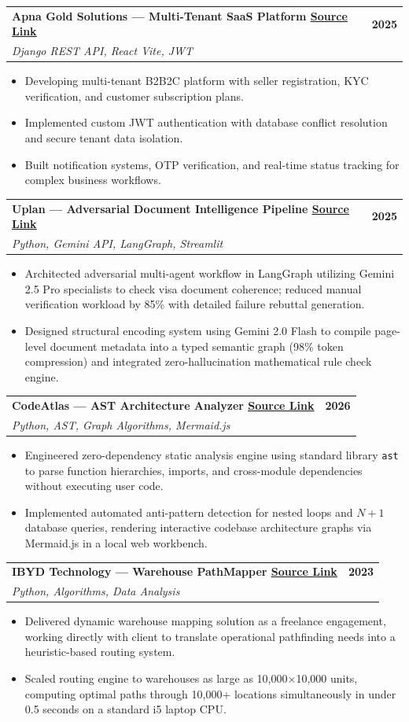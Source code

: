 \documentclass[letterpaper,10.5pt]{article}
\makeatletter
\newcommand{\resumeItem}[1]{
	\item\small{{#1}}
}
\newcommand{\resumeProjectHeading}[3]{
	\item
	\begin{tabular*}{\textwidth}[t]{l@{\extracolsep{\fill}}r}
		\textbf{#1} & \textbf{\small #3} \\
		\textit{\small#2} & \\
	\end{tabular*}\vspace{-4pt}
}
\newcommand{\resumeItemListStart}{\begin{itemize}[leftmargin=0.18in, itemsep=1.5pt, topsep=2pt, parsep=0pt]}
\newcommand{\resumeItemListEnd}{\end{itemize}\vspace{2pt}}
\makeatother
\begin{document}
	\resumeProjectHeading
	{Apna Gold Solutions — Multi-Tenant SaaS Platform {\href{https://apnagold.in}{\color{blue}\underline{Source Link}}}}{Django REST API, React Vite, JWT}{2025}
	\resumeItemListStart
	\resumeItem{Developing multi-tenant B2B2C platform with seller registration, KYC verification, and customer subscription plans.}
	\resumeItem{Implemented custom JWT authentication with database conflict resolution and secure tenant data isolation.}
	\resumeItem{Built notification systems, OTP verification, and real-time status tracking for complex business workflows.}
	\resumeItemListEnd 

	\resumeProjectHeading
	{Uplan — Adversarial Document Intelligence Pipeline {\href{https://huggingface.co/spaces/ksk76/AMDDeveloperHackathon}{\color{blue}\underline{Source Link}}}}{Python, Gemini API, LangGraph, Streamlit}{2025}
	\resumeItemListStart
	\resumeItem{Architected adversarial multi-agent workflow in LangGraph utilizing Gemini 2.5 Pro specialists to check visa document coherence; reduced manual verification workload by 85\% with detailed failure rebuttal generation.}
	\resumeItem{Designed structural encoding system using Gemini 2.0 Flash to compile page-level document metadata into a typed semantic graph (98\% token compression) and integrated zero-hallucination mathematical rule check engine.}
	\resumeItemListEnd

	\resumeProjectHeading
	{CodeAtlas — AST Architecture Analyzer {\href{https://github.com/Adarsh-Saurabh/CodeAtlas}{\color{blue}\underline{Source Link}}}}{Python, AST, Graph Algorithms, Mermaid.js}{2026}
	\resumeItemListStart
	\resumeItem{Engineered zero-dependency static analysis engine using standard library \texttt{ast} to parse function hierarchies, imports, and cross-module dependencies without executing user code.}
	\resumeItem{Implemented automated anti-pattern detection for nested loops and $N+1$ database queries, rendering interactive codebase architecture graphs via Mermaid.js in a local web workbench.}
	\resumeItemListEnd

	\resumeProjectHeading
	{IBYD Technology — Warehouse PathMapper {\href{https://youtu.be/nTAbJAMX3GY}{\color{blue}\underline{Source Link}}}}{Python, Algorithms, Data Analysis}{2023}
	\resumeItemListStart
	\resumeItem{Delivered dynamic warehouse mapping solution as a freelance engagement, working directly with client to translate operational pathfinding needs into a heuristic-based routing system.}
	\resumeItem{Scaled routing engine to warehouses as large as 10,000$\times$10,000 units, computing optimal paths through 10,000+ locations simultaneously in under 0.5 seconds on a standard i5 laptop CPU.}
	\resumeItemListEnd 
\end{document}
